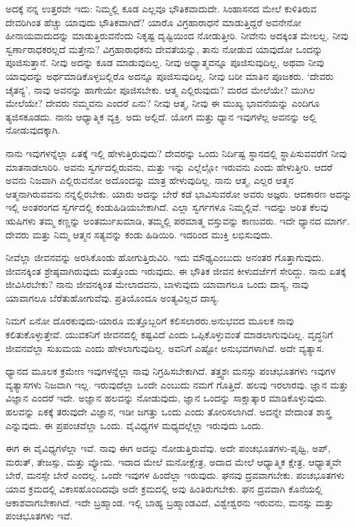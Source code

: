 ಅದಕ್ಕೆ ನನ್ನ ಉತ್ತರವೇ ಇದು: ನಿಮ್ಮಲ್ಲಿ ಕೂಡ ಎಲ್ಲವೂ ಭೌತಿಕವಾದುದೇ. ಸಿಂಹಾಸನದ ಮೇಲೆ ಕುಳಿತಿರುವ ದೇವರಿಗಿಂತ ಹೆಚ್ಚು ಯಾವುದು ಭೌತಿಕವಾಗಿದೆ? ಯಾರೊ ವಿಗ್ರಹಾರಾಧನೆ ಮಾಡುತ್ತಿದ್ದರೆ ಅವನೇನೋ ಹೀನಾಯವಾದುದನ್ನು ಮಾಡುತ್ತಿರುವನೆಂದು ನಿಕೃಷ್ಟ ದೃಷ್ಟಿಯಿಂದ ನೋಡುತ್ತೀರಿ. ನೀವೇನು ಅದಕ್ಕಿಂತ ಮೇಲಲ್ಲ. ನೀವು ಸ್ವರ್ಣಾರಾಧಕರಲ್ಲದೆ ಮತ್ತೇನು? ವಿಗ್ರಹಾರಾಧಕನು ದೇವತೆಯನ್ನು, ತಾನು ನೋಡುವ ಯಾವುದೋ ಒಂದನ್ನು ಪೂಜಿಸುತ್ತಾನೆ. ನೀವು ಅದನ್ನು ಕೂಡ ಮಾಡುವುದಿಲ್ಲ. ನೀವು ಅಧ್ಯಾತ್ಮವನ್ನೂ ಪೂಜಿಸುವುದಿಲ್ಲ, ಅಥವಾ ನೀವು ಯಾವುದನ್ನು ಅರ್ಥಮಾಡಿಕೊಳ್ಳಬಲ್ಲಿರೊ ಅದನ್ನೂ ಪೂಜಿಸುವುದಿಲ್ಲ. ನೀವು ಬರೀ ಮಾತಿನ ಪೂಜಕರು. `ದೇವರು ಚೈತನ್ಯ', ನಾವು ಅವನನ್ನು ಹಾಗೇಯೇ ಪೂಜಿಸಬೇಕು. ಆತ್ಮ ಎಲ್ಲಿರುವುದು? ಮರದ ಮೇಲೆಯೇ? ಮುಗಿಲ ಮೇಲೆಯೇ? ದೇವರು ನಮ್ಮವನು ಎಂದರೆ ಏನು? ನೀವು ಆತ್ಮ, ನೀವು ಈ ಮುಖ್ಯ ಭಾವನೆಯನ್ನು ಎಂದಿಗೂ ತ್ಯಜಿಸಕೂಡದು. ನಾನು ಆಧ್ಯಾತ್ಮಿಕ ವ್ಯಕ್ತಿ. ಅದು ಅಲ್ಲಿದೆ. ಯೋಗ ಮತ್ತು ಧ್ಯಾನ ಇವುಗಳೆಲ್ಲ ಅವನನ್ನು ಅಲ್ಲಿ ನೋಡುವುದಕ್ಕಾಗಿ.

ನಾನು ಇವುಗಳನ್ನೆಲ್ಲಾ ಏತಕ್ಕೆ ಇಲ್ಲಿ ಹೇಳುತ್ತಿರುವುದು? ದೇವರನ್ನು ಒಂದು ನಿರ್ದಿಷ್ಟ ಸ್ಥಾನದಲ್ಲಿ ಸ್ಥಾಪಿಸುವವರೆಗೆ ನೀವು ಮಾತನಾಡಲಾರಿರಿ. ಅವನು ಸ್ವರ್ಗದಲ್ಲಿರುವನು, ಮತ್ತು ಇನ್ನು ಎಲ್ಲೆಲ್ಲೋ ಇರುವನು ಎಂದು ಹೇಳುತ್ತೀರಿ. ಆದರೆ ಅವನು ನಿಜವಾಗಿ ಎಲ್ಲಿರುವನೋ ಅದೊಂದನ್ನು ಮಾತ್ರ ಹೇಳುವುದಿಲ್ಲ. ನಾನು ಆತ್ಮ, ಎಲ್ಲರ ಆತ್ಮನ ಆತ್ಮನಾಗಿರುವವನು ನನ್ನಲ್ಲಿರಬೇಕು. ಯಾರು ಅದನ್ನು ಬೇರೆ ಕಡೆ ಭಾವಿಸುವರೋ ಅವರು ಅಜ್ಞರು. ಆದಕಾರಣ ಅದನ್ನು ಇಲ್ಲಿ ಅಂತರಂಗದ ಸ್ವರ್ಗದಲ್ಲಿ ಕಂಡುಹಿಡಿಯಬೇಕಾಗಿದೆ. ಎಲ್ಲಾ ಸ್ವರ್ಗಗಳೂ ನಿಮ್ಮಲ್ಲಿವೆ. ಇದನ್ನು ಅರಿತ ಕೆಲವು ಋಷಿಗಳು ತಮ್ಮ ಕಣ್ಣನ್ನು ಅಂತರ್ಮುಖಮಾಡಿ, ತಮ್ಮಲ್ಲಿ ಪರಮಾತ್ಮ ವಸ್ತುವನ್ನು ಕಾಣುವರು. ಇದೇ ಧ್ಯಾನದ ಮಾರ್ಗ. ದೇವರು ಮತ್ತು ನಿಮ್ಮ ಆತ್ಮನ ಸತ್ಯವನ್ನು ಕಂಡು ಹಿಡಿಯಿರಿ. ಇದರಿಂದ ಮುಕ್ತಿ ಲಭಿಸುವುದು.

ನೀವೆಲ್ಲಾ ಜೀವನವನ್ನು ಅರಸಿಕೊಂಡು ಹೋಗುತ್ತಿರುವಿರಿ. ಇದು ಮೌಢ್ಯ\break ಎಂಬುದು ಅನಂತರ ಗೊತ್ತಾಗುವುದು. ಜೀವನಕ್ಕಿಂತ ಶ್ರೇಷ್ಠವಾಗಿರುವುದು ಮತ್ತೊಂದು ಇರುವುದು. ಈ ಭೌತಿಕ ಜೀವನ ಕೀಳುದರ್ಜೆಗೆ ಸೇರಿದ್ದು. ನಾನು ಏತಕ್ಕೆ ಜೀವಿಸಿರಬೇಕು? ನಾನು ಜೀವನಕ್ಕಿಂತ ಮೇಲಾದವನು, ಬಾಳುವುದು ಯಾವಾಗಲೂ ಒಂದು ದಾಸ್ಯ, ನಾವು ಯಾವಾಗಲೂ ಬೆರೆತುಹೋಗುವೆವು. ಪ್ರತಿಯೊಂದೂ ಅಂತ್ಯವಿಲ್ಲದ ದಾಸ್ಯ.

ನಿಮಗೆ ಏನೋ ದೊರಕುವುದು-ಯಾರೂ ಮತ್ತೊಬ್ಬರಿಗೆ ಕಲಿಸಲಾರರು.\break ಅನುಭವದ ಮೂಲಕ ನಾವು ಕಲಿತುಕೊಳ್ಳುತ್ತೇವೆ. ಯುವಕನಿಗೆ ಜೀವನದಲ್ಲಿ ಕಷ್ಟವಿದೆ ಎಂದು ಒಪ್ಪಿಕೊಳ್ಳುವಂತೆ ಮಾಡಲಾಗುವುದಿಲ್ಲ. ವೃದ್ಧನಿಗೆ ಜೀವನವೆಲ್ಲಾ ಸುಖಮಯ ಎಂದು ಹೇಳಲಾಗುವುದಿಲ್ಲ. ಅವನಿಗೆ ಎಷ್ಟೋ ಅನುಭವಗಳಾಗಿವೆ. ಅದೇ ವ್ಯತ್ಯಾಸ.

ಧ್ಯಾನದ ಮೂಲಕ ಕ್ರಮೇಣ ಇವುಗಳನ್ನೆಲ್ಲಾ ನಾವು ನಿಗ್ರಹಿಸಬೇಕಾಗಿದೆ. ತತ್ತ್ವಶಃ ಮನಸ್ಸು ಪಂಚಭೂತಗಳು ಇವುಗಳ ವ್ಯತ್ಯಾಸಗಳು ನಿಜವಾಗಿ ಇಲ್ಲ. ಇರುವುದೆಲ್ಲಾ ಒಂದೇ ಎಂಬುದು ನಮಗೆ ಗೊತ್ತಿದೆ. ಹಲವು ಇರಲಾರವು. ಜ್ಞಾನ ಮತ್ತು ವಿಜ್ಞಾನ ಎಂದರೆ ಇದೇ. ಅಜ್ಞಾನ ಹಲವನ್ನು ನೋಡುವುದು, ಜ್ಞಾನ ಒಂದನ್ನು ಸಾಕ್ಷಾತ್ಕಾರ ಮಾಡಿಕೊಳ್ಳುವುದು. ಹಲವನ್ನು ಏಕಕ್ಕೆ ತರುವುದೇ ವಿಜ್ಞಾನ, ಇಡೀ ಜಗತ್ತು ಒಂದು ಎಂದು ತೋರಿಸಲಾಗಿದೆ. ಅದನ್ನೇ ವೇದಾಂತ ಶಾಸ್ತ್ರ ಎನ್ನುವುದು. ಈ ಪ್ರಪಂಚವೆಲ್ಲಾ ಒಂದು. ವೈವಿಧ್ಯಗಳ ಮಧ್ಯದಲ್ಲೆಲ್ಲಾ ಇರುವುದು ಒಂದು.

ಈಗ ಈ ವೈವಿಧ್ಯಗಳೆಲ್ಲಾ ಇವೆ. ನಾವು ಈಗ ಅದನ್ನು ನೋಡುತ್ತಿರುವೆವು. ಅದೇ ಪಂಚಭೂತಗಳು-ಪೃಥ್ವಿ, ಅಪ್, ಮರುತ್, ತೇಜಸ್ಸು, ಮತ್ತು ವ್ಯೋಮ. ಇದಾದ ಮೇಲೆ ಮನೋಕ್ಷೇತ್ರ, ಅದಾದ ಮೇಲೆ ಆಧ್ಯಾತ್ಮಿಕ ಕ್ಷೇತ್ರ, ಆಧ್ಯಾತ್ಮವೇ ಬೇರೆ, ಮನಸ್ಸೇ ಬೇರೆ ಎಂದಲ್ಲ. ಒಂದೇ ಇವುಗಳ ಹಿಂದೆಲ್ಲಾ ಇರುವುದು. ಘನವು ದ್ರವವಾಗಬೇಕು. ಪಂಚಭೂತಗಳು ಯಾವ ಕ್ರಮದಲ್ಲಿ ವಿಕಾಸಹೊಂದಿದವೊ ಅದೇ ಕ್ರಮದಲ್ಲಿ ಅವು ಹಿಂತಿರುಗಬೇಕು. ಘನ ದ್ರವವಾಗಿ ಕೊನೆಯಲ್ಲಿ ಆಕಾಶವಾಗಬೇಕಾಗಿದೆ. ಇದೇ ಬ್ರಹ್ಮಾಂಡ. ಇಲ್ಲಿ ಬಾಹ್ಯ ಬ್ರಹ್ಮಾಂಡವಿದೆ, ವಿಶ್ವೇಶ್ವರನು ಇರುವನು, ಮನಸ್ಸು ಮತ್ತು ಪಂಚಭೂತಗಳು ಇವೆ.

